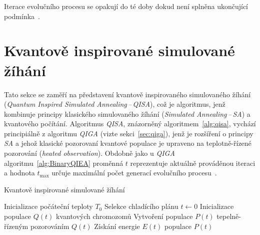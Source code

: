 Iterace evolučního procesu se opakují do té doby dokud není splněna ukončující podmínka~\cite{NaturalComputing,qiga}.

\section{Kvantově inspirované simulované žíhání}\label{sec:qisa}
Tato sekce se zaměří na představení kvantově inspirovaného simulovaného žíhání (\emph{Quantum Inspired Simulated Annealing\,--\,QISA}), což je algoritmus, jenž kombinuje principy klasického simulovaného žíhání (\emph{Simulated Annealing\,--\,SA}) a kvantového počítání. 
Algoritmus \emph{QISA}, znázorněný algoritmem~\ref{alg:qisa}, vychází principiálně z algoritmu \emph{QIGA} (vizte sekci~\ref{sec:qiga}), jenž je rozšíření o principy \emph{SA} a jehož klasické pozorovaní kvantové populace je upraveno na teplotně-řízené pozorování (\emph{heated observation}). 
Obdobně jako u \emph{QIGA} algoritmu~\ref{alg:BinaryQIEA} proměnná $t$ reprezentuje aktuálně prováděnou iteraci a hodnota $t_{\text{max}}$ určuje maximální počet generací evolučního procesu~\cite{qisa}. 

\begin{algorithm}[ht]
    \caption{Kvantově inspirované simulované žíhání~\cite{qisa}}
    \label{alg:qisa}
    Inicializace počáteční teploty $T_0$\;
    Selekce chladícího plánu\;
    $t \gets 0$\;
    Inicializace populace $Q\left(t\right)$ kvantových chromozomů\;
    Vytvoření populace $P\left(t\right)$ tepelně-řízeným pozorováním $Q\left(t\right)$\;
    Získání energie $E\left(t\right)$ populace $P\left(t\right)$\;
\end{algorithm}

